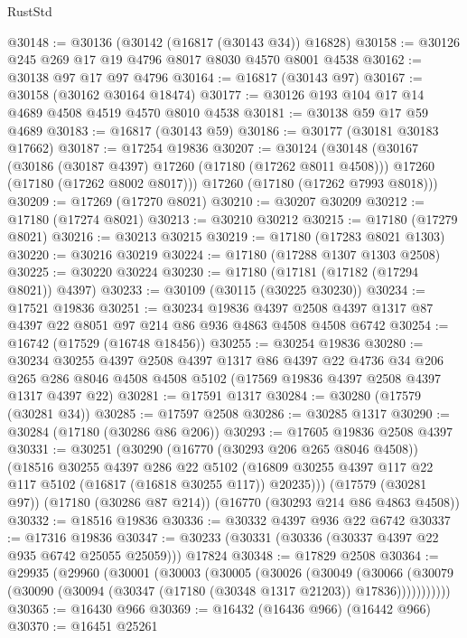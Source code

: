 \begin{lexlean}{RustStd}
\begin{coremodule}
@30148 := @30136 (@30142 (@16817 (@30143 @34)) @16828)
@30158 := @30126 @245 @269 @17 @19 @4796 @8017 @8030 @4570 @8001 @4538
@30162 := @30138 @97 @17 @97 @4796
@30164 := @16817 (@30143 @97)
@30167 := @30158 (@30162 @30164 @18474)
@30177 := @30126 @193 @104 @17 @14 @4689 @4508 @4519 @4570 @8010 @4538
@30181 := @30138 @59 @17 @59 @4689
@30183 := @16817 (@30143 @59)
@30186 := @30177 (@30181 @30183 @17662)
@30187 := @17254 @19836
@30207 := @30124
    (@30148
      (@30167
        (@30186 (@30187 @4397) @17260 (@17180 (@17262 @8011 @4508)))
        @17260
        (@17180 (@17262 @8002 @8017)))
      @17260
      (@17180 (@17262 @7993 @8018)))
@30209 := @17269 (@17270 @8021)
@30210 := @30207 @30209
@30212 := @17180 (@17274 @8021)
@30213 := @30210 @30212
@30215 := @17180 (@17279 @8021)
@30216 := @30213 @30215
@30219 := @17180 (@17283 @8021 @1303)
@30220 := @30216 @30219
@30224 := @17180 (@17288 @1307 @1303 @2508)
@30225 := @30220 @30224
@30230 := @17180 (@17181 (@17182 (@17294 @8021)) @4397)
@30233 := @30109 (@30115 (@30225 @30230))
@30234 := @17521 @19836
@30251 := @30234
    @19836
    @4397
    @2508
    @4397
    @1317
    @87
    @4397
    @22
    @8051
    @97
    @214
    @86
    @936
    @4863
    @4508
    @4508
    @6742
@30254 := @16742 (@17529 (@16748 @18456))
@30255 := @30254 @19836
@30280 := @30234
    @30255
    @4397
    @2508
    @4397
    @1317
    @86
    @4397
    @22
    @4736
    @34
    @206
    @265
    @286
    @8046
    @4508
    @4508
    @5102
    (@17569 @19836 @4397 @2508 @4397 @1317 @4397 @22)
@30281 := @17591 @1317
@30284 := @30280 (@17579 (@30281 @34))
@30285 := @17597 @2508
@30286 := @30285 @1317
@30290 := @30284 (@17180 (@30286 @86 @206))
@30293 := @17605 @19836 @2508 @4397
@30331 := @30251
    (@30290
      (@16770 (@30293 @206 @265 @8046 @4508))
      (@18516
        @30255
        @4397
        @286
        @22
        @5102
        (@16809 @30255 @4397 @117 @22 @117 @5102 (@16817 (@16818 @30255 @117)) @20235)))
    (@17579 (@30281 @97))
    (@17180 (@30286 @87 @214))
    (@16770 (@30293 @214 @86 @4863 @4508))
@30332 := @18516 @19836
@30336 := @30332 @4397 @936 @22 @6742
@30337 := @17316 @19836
@30347 := @30233 (@30331 (@30336 (@30337 @4397 @22 @935 @6742 @25055 @25059))) @17824
@30348 := @17829 @2508
@30364 := @29935
    (@29960
      (@30001
        (@30003
          (@30005
            (@30026
              (@30049
                (@30066
                  (@30079 (@30090 (@30094 (@30347 (@17180 (@30348 @1317 @21203)) @17836)))))))))))
@30365 := @16430 @966
@30369 := @16432 (@16436 @966) (@16442 @966)
@30370 := @16451 @25261

\end{coremodule}
\end{lexlean}
